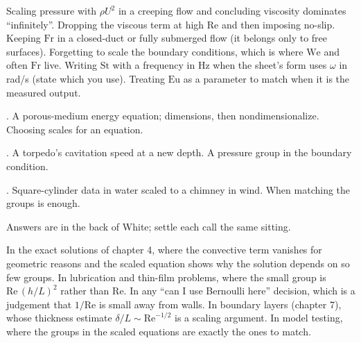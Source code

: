 \begin{trap}
Scaling pressure with $\rho U^2$ in a creeping flow and concluding viscosity dominates ``infinitely''. Dropping the viscous term at high $\mathrm{Re}$ and then imposing no-slip. Keeping $\mathrm{Fr}$ in a closed-duct or fully submerged flow (it belongs only to free surfaces). Forgetting to scale the boundary conditions, which is where $\mathrm{We}$ and often $\mathrm{Fr}$ live. Writing $\mathrm{St}$ with a frequency in Hz when the sheet's form uses $\omega$ in rad/s (state which you use). Treating $\mathrm{Eu}$ as a parameter to match when it is the measured output.
\end{trap}

\begin{ladder}
\item {}. A porous-medium energy equation; dimensions, then nondimensionalize. Choosing scales for an equation.
\item {}. A torpedo's cavitation speed at a new depth. A pressure group in the boundary condition.
\item {}. Square-cylinder data in water scaled to a chimney in wind. When matching the groups is enough.
\end{ladder}
Answers are in the back of White; settle each call the same sitting.


\begin{hides}
In the exact solutions of chapter 4, where the convective term vanishes for geometric reasons and the scaled equation shows why the solution depends on so few groups. In lubrication and thin-film problems, where the small group is $\mathrm{Re}\,(h/L)^2$ rather than $\mathrm{Re}$. In any ``can I use Bernoulli here'' decision, which is a judgement that $1/\mathrm{Re}$ is small away from walls. In boundary layers (chapter 7), whose thickness estimate $\delta/L \sim \mathrm{Re}^{-1/2}$ is a scaling argument. In model testing, where the groups in the scaled equations are exactly the ones to match.
\end{hides}
